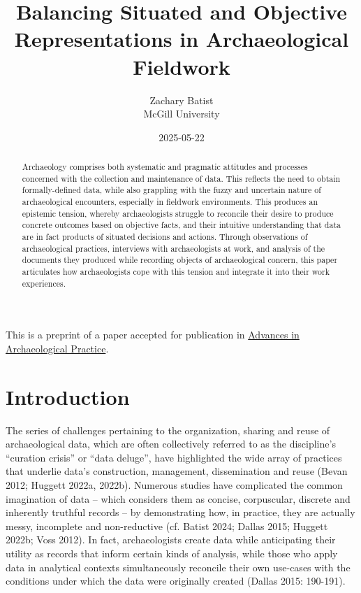 \documentclass[
]{article}
\title{Balancing Situated and Objective Representations in
Archaeological Fieldwork}
\author{
      {Zachary
Batist \orcidlink{0000-0003-0435-508X} \href{mailto:zachary.batist@mcgill.ca}{\Letter}} \\
          McGill University
     \\
  }
\date{2025-05-22}
\begin{document}
\maketitle
\begin{abstract}
Archaeology comprises both systematic and pragmatic attitudes and
processes concerned with the collection and maintenance of data. This
reflects the need to obtain formally-defined data, while also grappling
with the fuzzy and uncertain nature of archaeological encounters,
especially in fieldwork environments. This produces an epistemic
tension, whereby archaeologists struggle to reconcile their desire to
produce concrete outcomes based on objective facts, and their intuitive
understanding that data are in fact products of situated decisions and
actions. Through observations of archaeological practices, interviews
with archaeologists at work, and analysis of the documents they produced
while recording objects of archaeological concern, this paper
articulates how archaeologists cope with this tension and integrate it
into their work experiences.
\end{abstract}


\begin{tcolorbox}[enhanced jigsaw, rightrule=.15mm, bottomtitle=1mm, toptitle=1mm, opacitybacktitle=0.6, colback=white, colframe=quarto-callout-note-color-frame, arc=.35mm, colbacktitle=quarto-callout-note-color!10!white, opacityback=0, titlerule=0mm, breakable, title=\textcolor{quarto-callout-note-color}{\faInfo}\hspace{0.5em}{Note}, bottomrule=.15mm, toprule=.15mm, leftrule=.75mm, left=2mm, coltitle=black]

This is a preprint of a paper accepted for publication in
\href{https://www.cambridge.org/core/journals/advances-in-archaeological-practice}{Advances
in Archaeological Practice}.

\end{tcolorbox}

\section{Introduction}\label{introduction}

The series of challenges pertaining to the organization, sharing and
reuse of archaeological data, which are often collectively referred to
as the discipline's ``curation crisis'' or ``data deluge'', have
highlighted the wide array of practices that underlie data's
construction, management, dissemination and reuse (Bevan 2012; Huggett
2022a, 2022b). Numerous studies have complicated the common imagination
of data -- which considers them as concise, corpuscular, discrete and
inherently truthful records -- by demonstrating how, in practice, they
are actually messy, incomplete and non-reductive (cf. Batist 2024;
Dallas 2015; Huggett 2022b; Voss 2012). In fact, archaeologists create
data while anticipating their utility as records that inform certain
kinds of analysis, while those who apply data in analytical contexts
simultaneously reconcile their own use-cases with the conditions under
which the data were originally created (Dallas 2015: 190-191).
\end{document}
